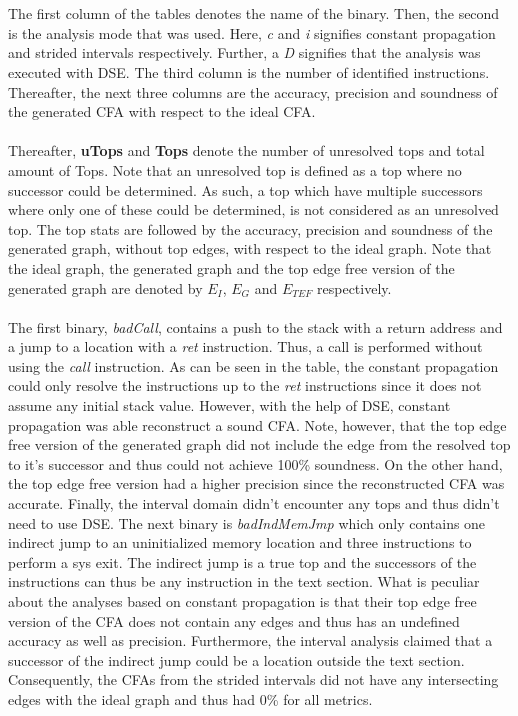 \documentclass{kththesis}
\renewcommand{\it}[1]{\textit{#1}}
\begin{document}
\\ \\
The first column of the tables denotes the name of the binary. Then, the second is the analysis mode that was used. Here, \it{c} and \it{i} signifies constant propagation and strided intervals respectively. Further, a \it{D} signifies that the analysis was executed with DSE. The third column is the number of identified instructions. Thereafter, the next three columns are the accuracy, precision and soundness of the generated CFA with respect to the ideal CFA. 
\\ \\
Thereafter, \textbf{uTops} and \textbf{Tops} denote the number of unresolved tops and total amount of Tops. Note that an unresolved top is defined as a top where no successor could be determined. As such, a top which have multiple successors where only one of these could be determined, is not considered as an unresolved top. The top stats are followed by the accuracy, precision and soundness of the generated graph, without top edges, with respect to the ideal graph. Note that the ideal graph, the generated graph and the top edge free version of the generated graph are denoted by $E_{I}$, $E_{G}$ and $E_{TEF}$ respectively.
\\ \\
The first binary, \it{badCall}, contains a push to the stack with a return address and a jump to a location with a \it{ret} instruction. Thus, a call is performed without using the \it{call} instruction. As can be seen in the table, the constant propagation could only resolve the instructions up to the \it{ret} instructions since it does not assume any initial stack value. However, with the help of DSE, constant propagation was able reconstruct a sound CFA. Note, however, that the top edge free version of the generated graph did not include the edge from the resolved top to it's successor and thus could not achieve 100\% soundness. On the other hand, the top edge free version had a higher precision since the reconstructed CFA was accurate. Finally, the interval domain didn't encounter any tops and thus didn't need to use DSE.
\clearpage
\noindent
The next binary is \it{badIndMemJmp} which only contains one indirect jump to an uninitialized memory location and three instructions to perform a sys exit. The indirect jump is a true top and the successors of the instructions can thus be any instruction in the text section.  What is peculiar about the analyses based on constant propagation is that their top edge free version of the CFA does not contain any edges and thus has an undefined accuracy as well as precision. Furthermore, the interval analysis claimed that a successor of the indirect jump could be a location outside the text section. Consequently, the CFAs from the strided intervals did not have any intersecting edges with the ideal graph and thus had 0\% for all metrics.
\end{document}
